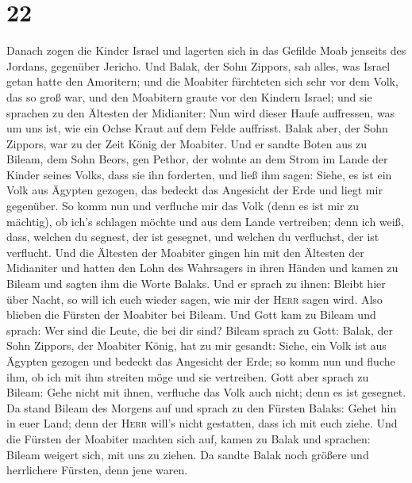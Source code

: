 \hypertarget{section-21}{%
\section{22}\label{section-21}}

 Danach zogen die Kinder Israel und lagerten sich in das
Gefilde Moab jenseits des Jordans, gegenüber Jericho.  Und
Balak, der Sohn Zippors, sah alles, was Israel getan hatte den
Amoritern;  und die Moabiter fürchteten sich sehr vor dem
Volk, das so groß war, und den Moabitern graute vor den Kindern Israel;
 und sie sprachen zu den Ältesten der Midianiter: Nun wird
dieser Haufe auffressen, was um uns ist, wie ein Ochse Kraut auf dem
Felde auffrisst. Balak aber, der Sohn Zippors, war zu der Zeit König der
Moabiter.  Und er sandte Boten aus zu Bileam, dem Sohn
Beors, gen Pethor, der wohnte an dem Strom im Lande der Kinder seines
Volks, dass sie ihn forderten, und ließ ihm sagen: Siehe, es ist ein
Volk aus Ägypten gezogen, das bedeckt das Angesicht der Erde und liegt
mir gegenüber.  So komm nun und verfluche mir das Volk
(denn es ist mir zu mächtig), ob ich's schlagen möchte und aus dem Lande
vertreiben; denn ich weiß, dass, welchen du segnest, der ist gesegnet,
und welchen du verfluchst, der ist verflucht.  Und die
Ältesten der Moabiter gingen hin mit den Ältesten der Midianiter und
hatten den Lohn des Wahrsagers in ihren Händen und kamen zu Bileam und
sagten ihm die Worte Balaks.  Und er sprach zu ihnen:
Bleibt hier über Nacht, so will ich euch wieder sagen, wie mir der
\textsc{Herr} sagen wird. Also blieben die Fürsten der Moabiter bei
Bileam.  Und Gott kam zu Bileam und sprach: Wer sind die
Leute, die bei dir sind?  Bileam sprach zu Gott: Balak,
der Sohn Zippors, der Moabiter König, hat zu mir gesandt:
 Siehe, ein Volk ist aus Ägypten gezogen und bedeckt das
Angesicht der Erde; so komm nun und fluche ihm, ob ich mit ihm streiten
möge und sie vertreiben.  Gott aber sprach zu Bileam:
Gehe nicht mit ihnen, verfluche das Volk auch nicht; denn es ist
gesegnet.  Da stand Bileam des Morgens auf und sprach zu
den Fürsten Balaks: Gehet hin in euer Land; denn der \textsc{Herr}
will's nicht gestatten, dass ich mit euch ziehe.  Und die
Fürsten der Moabiter machten sich auf, kamen zu Balak und sprachen:
Bileam weigert sich, mit uns zu ziehen.  Da sandte Balak
noch größere und herrlichere Fürsten, denn jene waren. 
